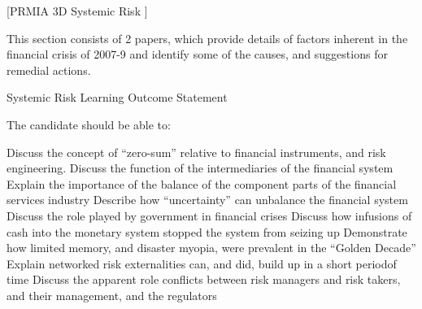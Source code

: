 [PRMIA 3D Systemic Risk ]
 
This section consists of 2 papers, which provide details of factors inherent in the financial crisis of 2007-9 and
identify some of the causes, and suggestions for remedial actions.
 
Systemic Risk Learning Outcome Statement
 
The candidate should be able to:
 
Discuss the concept of “zero-sum” relative to financial instruments, and risk engineering.
Discuss the function of the intermediaries of the financial system
Explain the importance of the balance of the component parts of the financial services industry
Describe how “uncertainty” can unbalance the financial system
Discuss the role played by government in financial crises
Discuss how infusions of cash into the monetary system stopped the system from seizing up
Demonstrate how limited memory, and disaster myopia, were prevalent in the “Golden Decade”
Explain networked risk externalities can, and did, build up in a short periodof time
Discuss the apparent role conflicts between risk managers and risk takers, and their management, and the regulators
